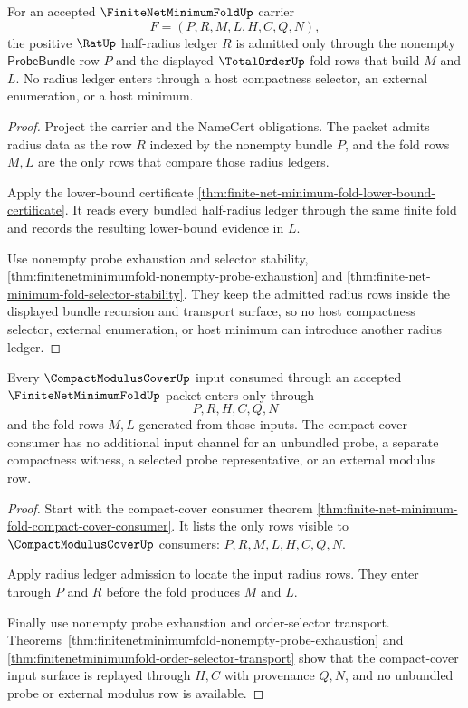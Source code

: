 \begin{theorem}
\label{thm:finitenetminimumfold-radius-ledger-admission}
For an accepted $\FiniteNetMinimumFoldUp$ carrier
$$
F=(P,R,M,L,H,C,Q,N),
$$
the positive $\RatUp$ half-radius ledger $R$ is admitted only through the nonempty $\mathsf{ProbeBundle}$ row $P$ and the displayed $\TotalOrderUp$ fold rows that build $M$ and $L$. No radius ledger enters through a host compactness selector, an external enumeration, or a host minimum.
\end{theorem}
\begin{proof}
Project the carrier and the NameCert obligations. The packet admits radius data as the row $R$ indexed by the nonempty bundle $P$, and the fold rows $M,L$ are the only rows that compare those radius ledgers.

Apply the lower-bound certificate \autoref{thm:finite-net-minimum-fold-lower-bound-certificate}. It reads every bundled half-radius ledger through the same finite fold and records the resulting lower-bound evidence in $L$.

Use nonempty probe exhaustion and selector stability, \autoref{thm:finitenetminimumfold-nonempty-probe-exhaustion} and \autoref{thm:finite-net-minimum-fold-selector-stability}. They keep the admitted radius rows inside the displayed bundle recursion and transport surface, so no host compactness selector, external enumeration, or host minimum can introduce another radius ledger.
\end{proof}

\begin{theorem}
\label{thm:finitenetminimumfold-compactmoduluscover-input-exactness}
Every $\CompactModulusCoverUp$ input consumed through an accepted $\FiniteNetMinimumFoldUp$ packet enters only through
$$
P,R,H,C,Q,N
$$
and the fold rows $M,L$ generated from those inputs. The compact-cover consumer has no additional input channel for an unbundled probe, a separate compactness witness, a selected probe representative, or an external modulus row.
\end{theorem}
\begin{proof}
Start with the compact-cover consumer theorem \autoref{thm:finite-net-minimum-fold-compact-cover-consumer}. It lists the only rows visible to $\CompactModulusCoverUp$ consumers: $P,R,M,L,H,C,Q,N$.

Apply radius ledger admission to locate the input radius rows. They enter through $P$ and $R$ before the fold produces $M$ and $L$.

Finally use nonempty probe exhaustion and order-selector transport. Theorems~\ref{thm:finitenetminimumfold-nonempty-probe-exhaustion} and \ref{thm:finitenetminimumfold-order-selector-transport} show that the compact-cover input surface is replayed through $H,C$ with provenance $Q,N$, and no unbundled probe or external modulus row is available.
\end{proof}

